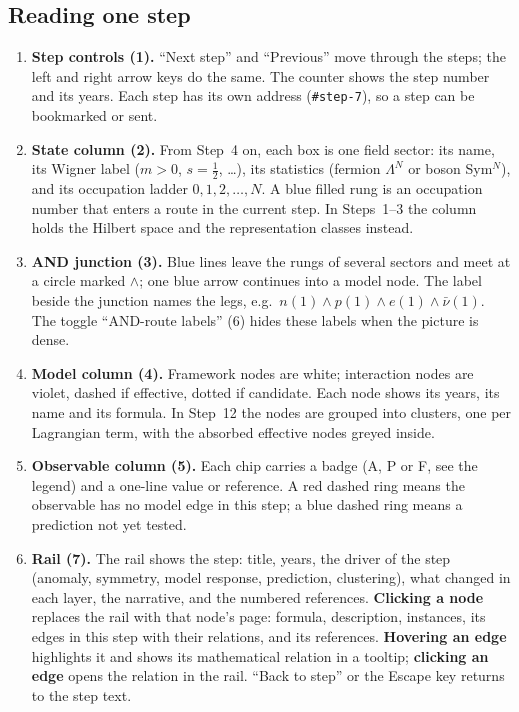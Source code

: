 \subsection{Reading one step}
\begin{enumerate}
\item \textbf{Step controls (1).} ``Next step'' and ``Previous'' move through the \nSteps{} steps; the left and right arrow keys do the same. The counter shows the step number and its years. Each step has its own address (\texttt{\#step-7}), so a step can be bookmarked or sent.
\item \textbf{State column (2).} From Step~4 on, each box is one field sector: its name, its Wigner label ($m>0$, $s=\tfrac12$, \dots), its statistics (fermion $\Lambda^N$ or boson Sym$^N$), and its occupation ladder $0,1,2,\dots,N$. A blue filled rung is an occupation number that enters a route in the current step. In Steps~1--3 the column holds the Hilbert space and the representation classes instead.
\item \textbf{AND junction (3).} Blue lines leave the rungs of several sectors and meet at a circle marked $\wedge$; one blue arrow continues into a model node. The label beside the junction names the legs, e.g.\ $n(1)\wedge p(1)\wedge e(1)\wedge\bar\nu(1)$. The toggle ``AND-route labels'' (6) hides these labels when the picture is dense.
\item \textbf{Model column (4).} Framework nodes are white; interaction nodes are violet, dashed if effective, dotted if candidate. Each node shows its years, its name and its formula. In Step~12 the nodes are grouped into clusters, one per Lagrangian term, with the absorbed effective nodes greyed inside.
\item \textbf{Observable column (5).} Each chip carries a badge (A, P or F, see the legend) and a one-line value or reference. A red dashed ring means the observable has no model edge in this step; a blue dashed ring means a prediction not yet tested.
\item \textbf{Rail (7).} The rail shows the step: title, years, the driver of the step (anomaly, symmetry, model response, prediction, clustering), what changed in each layer, the narrative, and the numbered references. \textbf{Clicking a node} replaces the rail with that node's page: formula, description, instances, its edges in this step with their relations, and its references. \textbf{Hovering an edge} highlights it and shows its mathematical relation in a tooltip; \textbf{clicking an edge} opens the relation in the rail. ``Back to step'' or the Escape key returns to the step text.

\end{enumerate}
